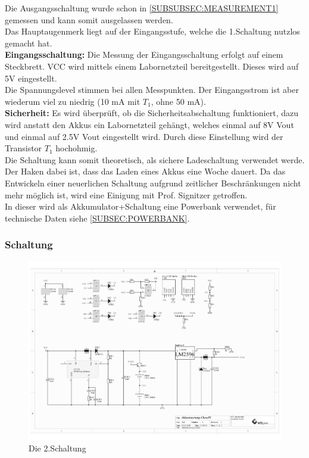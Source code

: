 \documentclass[12pt,a4paper]{article}
\begin{document}
{Die Ausgangsschaltung wurde schon in \ref{SUBSUBSEC:MEASUREMENT1} gemessen und kann somit ausgelassen werden.  \\
Das Hauptaugenmerk liegt auf der Eingangsstufe, welche die 1.Schaltung nutzlos gemacht hat. \\

\textbf{Eingangsschaltung: }Die Messung der Eingangsschaltung erfolgt auf einem Steckbrett. VCC wird mittels einem Labornetzteil bereitgestellt. Dieses wird auf 5V eingestellt. \\
Die Spannungslevel stimmen bei allen Messpunkten. Der Eingangsstrom ist aber wiederum viel zu niedrig (10 mA mit $T_1$, ohne 50 mA). \\
\textbf{Sicherheit:} Es wird überprüft, ob die Sicherheitsabschaltung funktioniert, dazu wird anstatt den Akkus ein Labornetzteil gehängt, welches einmal auf 8V Vout und einmal auf 2.5V Vout eingestellt wird. Durch diese Einstellung wird der Transistor $T_1$ hochohmig. \\
Die Schaltung kann somit theoretisch, als sichere Ladeschaltung verwendet werde. Der Haken dabei ist, dass das Laden eines Akkus eine Woche dauert. Da das Entwickeln einer neuerlichen Schaltung aufgrund zeitlicher Beschränkungen nicht mehr möglich ist, wird eine Einigung mit Prof. Signitzer getroffen. \\
In dieser wird als Akkumulator+Schaltung eine Powerbank verwendet, für technische Daten siehe \ref{SUBSEC:POWERBANK}.

\subsubsection{Schaltung}
\label{SUBSUBSEC:CIRCUIT-2}
\begin{figure}[H]
  \centering
		\includegraphics[scale=0.7, angle=90]{graphics/20171104-Shematics.pdf}
		\caption{Die 2.Schaltung}
		\label{fig:circuit2}
\end{figure}

}
\end{document}
